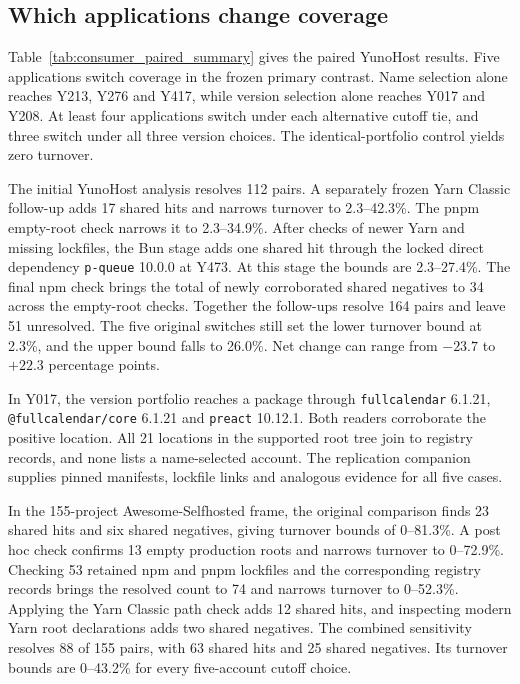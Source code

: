 \subsection{Which applications change coverage}
Table~\ref{tab:consumer_paired_summary} gives the paired YunoHost results. Five applications switch coverage in the frozen primary contrast. Name selection alone reaches Y213, Y276 and Y417, while version selection alone reaches Y017 and Y208. At least four applications switch under each alternative cutoff tie, and three switch under all three version choices. The identical-portfolio control yields zero turnover.



The initial YunoHost analysis resolves 112 pairs. A separately frozen Yarn Classic follow-up adds 17 shared hits and narrows turnover to 2.3--42.3\%. The pnpm empty-root check narrows it to 2.3--34.9\%. After checks of newer Yarn and missing lockfiles, the Bun stage adds one shared hit through the locked direct dependency \texttt{p-queue} 10.0.0 at Y473. At this stage the bounds are 2.3--27.4\%. The final npm check brings the total of newly corroborated shared negatives to 34 across the empty-root checks. Together the follow-ups resolve 164 pairs and leave 51 unresolved. The five original switches still set the lower turnover bound at 2.3\%, and the upper bound falls to 26.0\%. Net change can range from $-23.7$ to $+22.3$ percentage points.

In Y017, the version portfolio reaches a package through \texttt{fullcalendar} 6.1.21, \texttt{@fullcalendar/core} 6.1.21 and \texttt{preact} 10.12.1. Both readers corroborate the positive location. All 21 locations in the supported root tree join to registry records, and none lists a name-selected account. The replication companion supplies pinned manifests, lockfile links and analogous evidence for all five cases.

In the 155-project Awesome-Selfhosted frame, the original comparison finds 23 shared hits and six shared negatives, giving turnover bounds of 0--81.3\%. A post hoc check confirms 13 empty production roots and narrows turnover to 0--72.9\%. Checking 53 retained npm and pnpm lockfiles and the corresponding registry records brings the resolved count to 74 and narrows turnover to 0--52.3\%. Applying the Yarn Classic path check adds 12 shared hits, and inspecting modern Yarn root declarations adds two shared negatives. The combined sensitivity resolves 88 of 155 pairs, with 63 shared hits and 25 shared negatives. Its turnover bounds are 0--43.2\% for every five-account cutoff choice.

